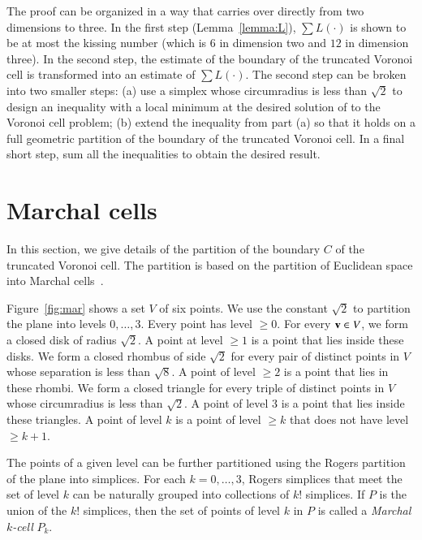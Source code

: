 \documentclass{llncs}
\begin{document}
\begin{remark}
  The proof can be organized in a way that carries over directly from
  two dimensions to three.  In the first step (Lemma~\ref{lemma:L}),
  $\sum L(\cdot)$ is shown to be at most the kissing number (which is $6$ in dimension two and
$12$ in dimension three).  In the
  second step, the estimate of the boundary of the truncated Voronoi
  cell is transformed into an estimate of $\sum L(\cdot)$.  The second
  step can be broken into two smaller steps: (a) use a simplex whose
  circumradius is less than $\sqrt2$ to design an inequality with a
  local minimum at the desired solution of to the Voronoi cell
  problem; (b) extend the inequality from part (a) so that it holds on
  a full geometric partition of the boundary of the truncated Voronoi
  cell.  In a final short step, sum all the inequalities to obtain the
  desired result.
\end{remark}


\section{Marchal cells}

In this section, we give details of the partition of the boundary $C$
of the truncated Voronoi cell.  The partition is based on the
partition of Euclidean space into Marchal cells~\cite{marchal:2009}.

Figure~\ref{fig:mar} shows a set $V$ of six points.  We use the
constant $\sqrt2$ to partition the plane into levels $0,\ldots,3$.
Every point has level $\ge 0$.
For every ${\mathbf v}\in V$, we form a closed disk of radius $\sqrt2$.  A
point at level $\ge1$ is a point that lies inside these disks.  We form a
closed rhombus of side $\sqrt2$ for every pair of distinct points in
$V$ whose separation is less than $\sqrt8$.  A point of level $\ge2$
is a point that lies in these rhombi.  We form a closed triangle
for every triple of distinct points in $V$ whose circumradius is less
than $\sqrt2$.  A point of level $3$ is a point that lies inside
these triangles.  A point of level $k$
is a point of level $\ge k$ that does not have level $\ge k+1$.

The points of a given level can be further partitioned using the
Rogers partition of the plane into simplices.  For each
$k=0,\ldots,3$, Rogers simplices that meet the set of level $k$ can be
naturally grouped into collections of $k!$ simplices.  If $P$ is the
union of the $k!$ simplices, then the set of points of level $k$ in
$P$ is called a {\it Marchal $k$-cell} $P_k$.
\end{document}
